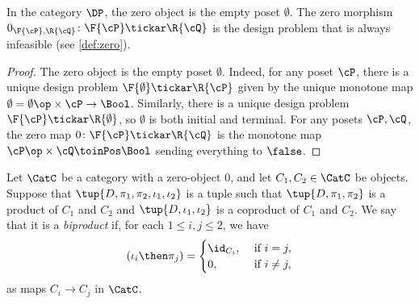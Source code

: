 \begin{lemma}
In the category $\DP$, the zero object is the empty poset $\emptyset$. The zero morphism $0_{\F{\cP},\R{\cQ}}\colon \F{\cP} \tickar \R{\cQ}$ is the design problem that is always infeasible (see \cref{def:zero}).
\end{lemma}
\begin{proof}
    The zero object is the empty poset $\emptyset$. Indeed, for any poset $\cP $, there is a unique design problem $\F{\emptyset} \tickar \R{\cP} $ given by the unique monotone map $\emptyset=\emptyset\op\times \cP \to\Bool$. Similarly, there is a unique design problem $\F{\cP} \tickar \R{\emptyset}$, so $\emptyset$ is both initial and terminal. For any posets $\cP ,\cQ $, the zero map $0 \colon \F{\cP} \tickar \R{\cQ}$ is the monotone map $\cP \op\times \cQ \toinPos \Bool$ sending everything to $\false$.
\end{proof}

\begin{shaded}
\begin{definition}[Biproduct]
Let $\CatC$ be a category with a zero-object $0$, and let $C_1,C_2\in\CatC$ be objects. Suppose that $\tup{D,\pi_1,\pi_2,\iota_1,\iota_2}$ is a tuple such that $\tup{D,\pi_1,\pi_2}$ is a product of $C_1$ and $C_2$ and $\tup{D,\iota_1,\iota_2}$ is a coproduct of $C_1$ and $C_2$. We say that it is a \emph{biproduct} if, for each $1\leq i,j\leq 2$, we have
\begin{equation}
(\iota_i\then \pi_j)=
\begin{cases}
	\id_{C_i}, &\text{ if }i=j,\\
	0, &\text{ if }i\neq j,
\end{cases} \label{eq:biproduct-condition}
\end{equation}
as maps $C_i\to C_j$ in $\CatC$.
\end{definition}
\end{shaded}

